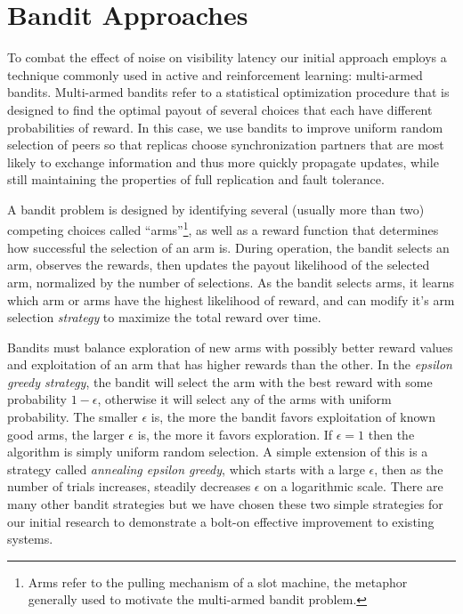 \section*{Bandit Approaches}

To combat the effect of noise on visibility latency our initial approach
employs a technique commonly used in active and reinforcement learning:
multi-armed bandits.
Multi-armed bandits refer to a statistical optimization procedure that is
designed to find the optimal payout of several choices that each have
different probabilities of reward.
In this case, we use bandits to improve uniform random selection of peers so
that replicas choose synchronization partners that are most likely to exchange
information and thus more quickly propagate updates, while still maintaining
the properties of full replication and fault tolerance.

A bandit problem is designed by identifying several (usually more than two)
competing choices called ``arms''\footnote{Arms refer to the pulling
mechanism of a slot machine, the metaphor generally used to motivate the
multi-armed bandit problem.}, as well as a reward function that determines how
successful the selection of an arm is.
During operation, the bandit selects an arm, observes the rewards, then
updates the payout likelihood of the selected arm, normalized by the number
of selections.
As the bandit selects arms, it learns which arm or arms have the highest
likelihood of reward, and can modify it's arm selection \emph{strategy} to
maximize the total reward over time.

Bandits must balance exploration of new arms with possibly better reward
values and exploitation of an arm that has higher rewards than the other.
In the \emph{epsilon greedy strategy}, the bandit will select the arm with
the best reward with some probability $1-\epsilon$, otherwise it will select
any of the arms with uniform probability.
The smaller $\epsilon$ is, the more the bandit favors exploitation of known
good arms, the larger $\epsilon$ is, the more it favors exploration.
If $\epsilon=1$ then the algorithm is simply uniform random selection.
A simple extension of this is a strategy called \emph{annealing epsilon
greedy}, which starts with a large $\epsilon$, then as the number of trials
increases, steadily decreases $\epsilon$ on a logarithmic scale.
There are many other bandit strategies but we have chosen these two simple
strategies for our initial research to demonstrate a bolt-on effective
improvement to existing systems.


